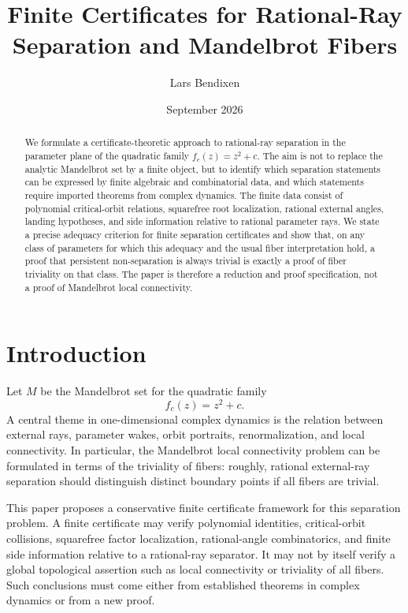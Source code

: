 \documentclass[11pt]{amsart}
\title[Finite Certificates for Mandelbrot Fibers]{Finite Certificates for Rational-Ray Separation and Mandelbrot Fibers}
\author{Lars Bendixen}
\date{September 2026}
\begin{document}
\begin{abstract}
We formulate a certificate-theoretic approach to rational-ray separation in the parameter plane of the quadratic family \(f_c(z)=z^2+c\).  The aim is not to replace the analytic Mandelbrot set by a finite object, but to identify which separation statements can be expressed by finite algebraic and combinatorial data, and which statements require imported theorems from complex dynamics.  The finite data consist of polynomial critical-orbit relations, squarefree root localization, rational external angles, landing hypotheses, and side information relative to rational parameter rays.  We state a precise adequacy criterion for finite separation certificates and show that, on any class of parameters for which this adequacy and the usual fiber interpretation hold, a proof that persistent non-separation is always trivial is exactly a proof of fiber triviality on that class.  The paper is therefore a reduction and proof specification, not a proof of Mandelbrot local connectivity.
\end{abstract}

\maketitle

\tableofcontents

\section{Introduction}

Let \(M\) be the Mandelbrot set for the quadratic family
\[
        f_c(z)=z^2+c.
\]
A central theme in one-dimensional complex dynamics is the relation between external rays, parameter wakes, orbit portraits, renormalization, and local connectivity.  In particular, the Mandelbrot local connectivity problem can be formulated in terms of the triviality of fibers: roughly, rational external-ray separation should distinguish distinct boundary points if all fibers are trivial.

This paper proposes a conservative finite certificate framework for this separation problem.  A finite certificate may verify polynomial identities, critical-orbit collisions, squarefree factor localization, rational-angle combinatorics, and finite side information relative to a rational-ray separator.  It may not by itself verify a global topological assertion such as local connectivity or triviality of all fibers.  Such conclusions must come either from established theorems in complex dynamics or from a new proof.
\end{document}

